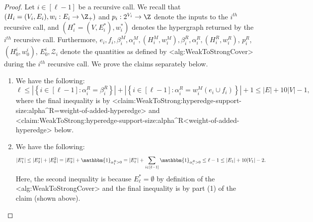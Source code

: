 \documentclass{article}
\def\Cref#1{<#1>}%
\newcommand{\zeros}{\ensuremath{\mathcal{Z}}\xspace}
\newcommand{\indicator}{\ensuremath{\mathbbm{1}}\xspace}
\newcommand{\shubhang}[1]{{\color{blue}[{\tiny Shubhang: \bf #1}]\marginpar{\color{blue}*}}}
\begin{document}
\begin{proof}
Let $i \in [\ell - 1]$ be a recursive call. We recall that $(H_i = (V_i, E_i), w_i:E_i \rightarrow \Z_+)$ and $p_i : 2^{V_i} \rightarrow \Z$ denote the inputs to the $i^{th}$ recursive call, and $(H_i^* = (V, E_i^*), w_i^*)$ denotes the hypergraph returned by the $i^{th}$ recursive call. Furthermore, $e_i, f_i, \beta_i^M, \alpha_i^M, (H_i^M, w_i^M), \beta_i^R, \alpha_i^R, (H_i^R, w_i^R)$, $p_i^R$, $(H_0^{i}, w_0^{i})$, $E_0^i, \zeros_i$ denote the quantities  as defined by \Cref{alg:WeakToStrongCover} during the $i^{th}$ recursive call.
    We prove the claims separately below.
    \begin{enumerate}
        \item We have the following:
        $$\ell \leq \left|\left\{i \in [\ell - 1] : \alpha_i^R = \beta_i^R\right\}\right|  +  \left|\left\{i \in [\ell- 1] : \alpha_i^R = w_i^M(e_i \cup f_i)\right\}\right| + 1 \leq |E| + 10|V| - 1,$$
        where the final inequality is by \Cref{claim:WeakToStrong:hyperedge-support-size:alpha^R=weight-of-added-hyperedge} and \Cref{claim:WeakToStrong:hyperedge-support-size:alpha^R<weight-of-added-hyperedge} below.
        \item 
        We have the following:
        $$|E_1^*| \leq |E_2^*| + |E_0^2| =   |E_{2}^*| + \indicator_{\alpha_1^R > 0} = |E_{\ell}^*| + \sum_{i \in [\ell - 1]}\indicator_{\alpha_i^R > 0} \leq \ell - 1\leq |E_1| + 10|V_1| - 2.$$
        Here, the second inequality is because $E_{\ell}^* = \emptyset$ by definition of the \Cref{alg:WeakToStrongCover} and the final inequality is by part (1) of the claim (shown above).
    \end{enumerate}
\end{proof}
\end{document}
